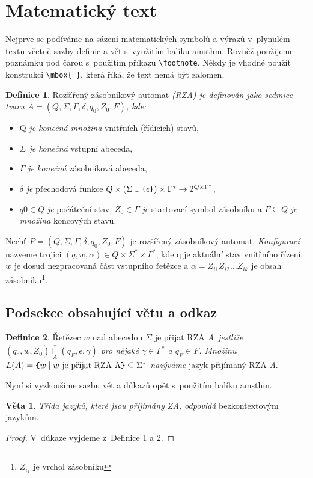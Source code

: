 \documentclass[a4paper, 11pt, twocolumn]{article}
\theoremstyle{definition}
\newtheorem{definition}{Definice}
\newtheorem{sentence}{Věta}
\begin{document}
\section{Matematický text}
Nejprve se podíváme na sázení matematických symbolů
a výrazů v~plynulém textu včetně sazby definic a vět s~využitím balíku amsthm. Rovněž použijeme poznámku pod
čarou s~použitím příkazu \verb!\footnote!. Někdy je vhodné
použít konstrukci \verb!\mbox{ }!, která říká, že text nemá být
zalomen.
\begin{definition} \label{eq:1}
Rozšířený zásobníkový automat {\it (RZA) je definován jako sedmice tvaru $A = (Q, \Sigma, \Gamma, \delta, q_0, Z_0, F)$, kde:}
\end{definition}
\begin{itemize}
\item Q {\it je konečná množina} vnitřních (řídicích) stavů,
\item $\Sigma$ {\it je konečná} vstupní abeceda,
\item $\Gamma$ {\it je konečná} zásobníková abeceda,
\item $\delta$ {\it je} přechodová funkce $Q\times(\Sigma\cup\verb!{!\epsilon\verb!}!)\times\Gamma^{\ast} \rightarrow 2^{Q \times \Gamma^{\ast}}$,
\item $q0 \in Q$ {\it je} počáteční stav, $Z_0 \in \Gamma$ {\it je} startovací symbol
zásobníku a $F \subseteq Q$ {\it je množina} koncových stavů.
\end{itemize} \par
Nechť $P = (Q , \Sigma , \Gamma , \delta , q_0 , Z_0 , F)$ je rozšířený zásobníkový automat. {\it Konfigurací} nazveme trojici $(q, w, \alpha) \in Q \times \Sigma^{\ast} \times\Gamma^{\ast}$, kde q je aktuální stav vnitřního řízení,
$w$ je dosud nezpracovaná část vstupního řetězce a $\alpha = Z_{i1}Z_{i2}\ldots Z_{ik}$
je obsah zásobníku\footnote{$Z_{i_1}$ je vrchol zásobníku}.

\subsection{Podsekce obsahující větu a odkaz}
\begin{definition}
Řetězec $w$ nad abecedou $\Sigma$ je přijat RZA
{\it A~jestliže $(q_0, w, Z_0) \overset{*}{\underset{A}\vdash} (q_F , \epsilon , \gamma)$ pro nějaké $\gamma\in\Gamma^{\ast}$ a $q_F\in F$. Množinu $L(A) = \verb!{!w \mid w$ je přijat RZA A$\verb!}! \subseteq \Sigma^{\ast}$ nazýváme} jazyk přijímaný RZA {\it A}.
\end{definition}
Nyní si vyzkoušíme sazbu vět a důkazů opět s~použitím
balíku amsthm.
\begin{sentence}
{\it Třída jazyků, které jsou přijímány ZA, odpovídá}
bezkontextovým jazykům.
\end{sentence}
\begin{proof}
V~důkaze vyjdeme z~Definice 1 a 2.
\end{proof}
\end{document}
